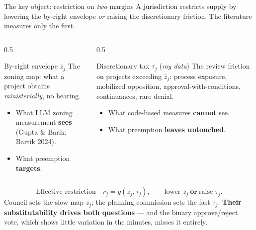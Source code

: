 \documentclass[10pt,aspectratio=169]{beamer}
\begin{document}
\begin{frame}{The key object: restriction on \emph{two} margins}
A jurisdiction restricts supply by lowering the by-right envelope \emph{or} raising the
discretionary friction. The literature measures only the first.
\medskip
\begin{columns}[T]
\begin{column}{0.5\textwidth}
\begin{block}{By-right envelope $\bar z_j$}
The zoning map: what a project obtains \emph{ministerially}, no hearing.
\begin{itemize}\small
  \item What LLM zoning measurement \textbf{sees} (Gupta \& Barik; Bartik 2024).
  \item What preemption \textbf{targets}.
\end{itemize}
\end{block}
\end{column}
\begin{column}{0.5\textwidth}
\begin{alertblock}{Discretionary tax $\tau_j$ \quad(\emph{my data})}
The review friction on projects exceeding $\bar z_j$: process exposure, mobilized opposition,
approval-with-conditions, continuances, rare denial.
\begin{itemize}\small
  \item What code-based measures \textbf{cannot} see.
  \item What preemption \textbf{leaves untouched}.
\end{itemize}
\end{alertblock}
\end{column}
\end{columns}
\medskip
\[ \text{Effective restriction}\quad r_j = g(\bar z_j,\tau_j),\qquad
   \text{lower } \bar z_j \ \textbf{or}\ \text{raise } \tau_j. \]
\footnotesize Council sets the slow map $\bar z_j$; the planning commission sets the fast
$\tau_j$. \textbf{Their substitutability drives both questions} --- and the binary approve/reject
vote, which shows little variation in the minutes, misses it entirely.
\end{frame}
\end{document}
